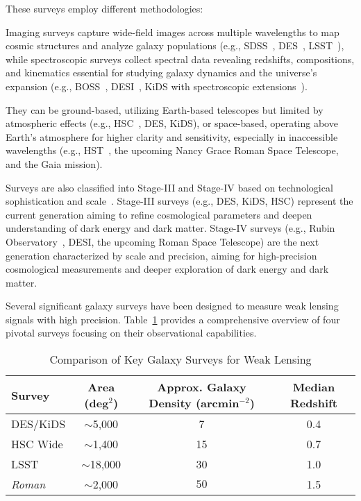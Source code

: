 \noindent These surveys employ different methodologies: 

Imaging surveys capture wide-field images across multiple wavelengths to map cosmic structures and analyze galaxy populations (e.g., SDSS~\citep{2019BAAS...51g.274K}, DES~\citep{2018ApJS..239...18A}, LSST~\citep{2019ApJ...873..111I}), while spectroscopic surveys collect spectral data revealing redshifts, compositions, and kinematics essential for studying galaxy dynamics and the universe's expansion (e.g., BOSS~\citep{2013AJ....145...10D}, DESI~\citep{2016arXiv161100036D}, KiDS with spectroscopic extensions~\citep{2013Msngr.154...44D}).

They can be ground-based, utilizing Earth-based telescopes but limited by atmospheric effects (e.g., HSC~\citep{2018PASJ...70S...4A}, DES, KiDS), or space-based, operating above Earth's atmosphere for higher clarity and sensitivity, especially in inaccessible wavelengths (e.g., HST~\citep{2001ApJ...553...47F}, the upcoming Nancy Grace Roman Space Telescope\citep{2015arXiv150303757S}, and the Gaia mission\citep{2016A&A...595A...2G}).

Surveys are also classified into Stage-III and Stage-IV based on technological sophistication and scale~\citep{2006astro.ph..9591A}. Stage-III surveys (e.g., DES, KiDS, HSC) represent the current generation aiming to refine cosmological parameters and deepen understanding of dark energy and dark matter. Stage-IV surveys (e.g., Rubin Observatory~\citep{2019ApJ...873..111I}, DESI, the upcoming Roman Space Telescope) are the next generation characterized by scale and precision, aiming for high-precision cosmological measurements and deeper exploration of dark energy and dark matter.

Several significant galaxy surveys have been designed to measure weak lensing signals with high precision. Table~\ref{tab:survey_comparison} provides a comprehensive overview of four pivotal surveys focusing on their observational capabilities.
\begin{table}[h]
    \centering
    \caption{Comparison of Key Galaxy Surveys for Weak Lensing}
    \label{tab:survey_comparison}
    \begin{tabular}{lccc}
        \toprule
        \textbf{Survey} & \textbf{Area (deg$^2$)} & \textbf{Approx. Galaxy Density (arcmin$^{-2}$)} & \textbf{Median Redshift} \\
        \midrule
        DES/KiDS & $\sim$5,000 &  7 & 0.4 \\
        HSC Wide & $\sim$1,400 &  15 & 0.7 \\
        LSST & $\sim$18,000 & 30 & 1.0 \\
        \textit{Roman} & $\sim$2,000 & $50$ & 1.5 \\
        \bottomrule
    \end{tabular}
\end{table}

